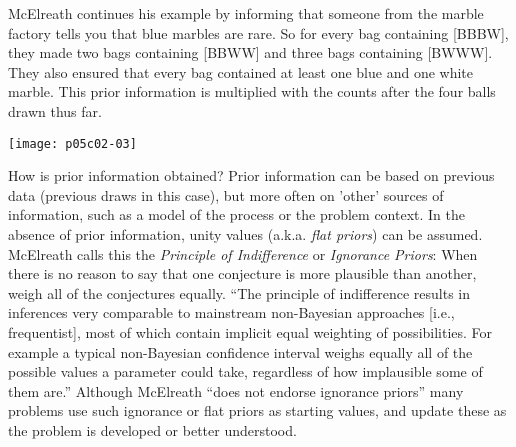 McElreath \cite{McElreath2015} continues his example by informing that 
someone from the marble factory tells you that blue marbles are rare. So for every bag containing [BBBW], they made two bags containing [BBWW] and three bags containing [BWWW]. They also ensured that every bag contained at least one blue and one white marble.
This prior information is multiplied with the counts after the four balls drawn thus far.
\begin{marginfigure}
\texttt{[image: p05c02-03]}
\end{marginfigure}

How is prior information obtained?  Prior information can be based on previous data (previous draws in this case), but more often on 'other' sources of information, such as a model of the process or the problem context. In the absence of prior information, unity values (a.k.a. \textit{flat priors}) can be assumed.  McElreath  calls this the \textit{Principle of Indifference} or \textit{Ignorance Priors}: When there is no reason to say that one conjecture is more plausible than another, weigh all of the conjectures equally. ``The principle of indifference results in inferences very comparable to mainstream non-Bayesian approaches [i.e., frequentist], most of which contain implicit equal weighting of possibilities. For example a typical non-Bayesian confidence interval weighs equally all of the possible values a parameter could take, regardless of how implausible some of them are.''\cite{McElreath2015}  Although McElreath ``does not endorse ignorance priors'' many problems use such ignorance or flat priors as starting values, and update these as the problem is developed or better understood.


